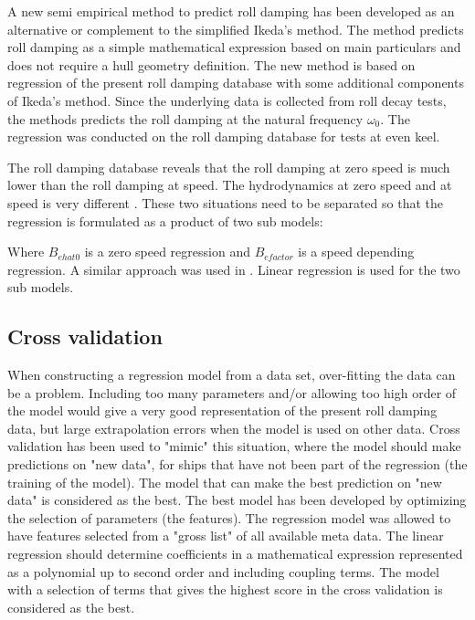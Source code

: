 A new semi empirical method to predict roll damping has been developed as an alternative or complement to the simplified Ikeda's method. The method  predicts roll damping as a simple mathematical expression based on main particulars and does not require a hull geometry definition. 
The new method is based on regression of the present roll damping database with some additional components of Ikeda's method. Since the underlying data is collected from roll decay tests, the methods predicts the roll damping at the natural frequency $\omega_0$.  
The regression was conducted on the roll damping database for tests at even keel. 

The roll damping database reveals that the roll damping at zero speed is much lower than the roll damping at speed. The hydrodynamics at zero speed and at speed is very  different \parencite{ikeda_velocity_1979}. These two situations need to be separated so that  the regression is formulated  as a product of two sub models:

Where $B_{ehat0}$ is a zero speed regression and $B_{efactor}$ is a speed depending regression. A similar approach was used in \parencite{henry_peter_piehl_ship_2016}. Linear regression is  used for the two sub models. 

\subsection{Cross validation}
When constructing a regression model from a data set, over-fitting the data can be a problem. Including too many parameters and/or allowing too high order of the model would give a very good representation of the present roll damping data, but large extrapolation errors when the model is used on other data. Cross validation has been used to "mimic" this situation, where the model should make predictions on "new data", for ships that have not been part of the regression (the training of the model). The model that can make the best prediction on "new data" is considered as the best. The best model has been developed by optimizing the selection of parameters (the features). The regression model was allowed to have features selected from a "gross list" of all available meta data. The linear regression should determine coefficients in a mathematical expression represented as a polynomial up to second order and including coupling terms. The model with a selection of terms that gives the highest score in the cross validation is considered as the best.    

